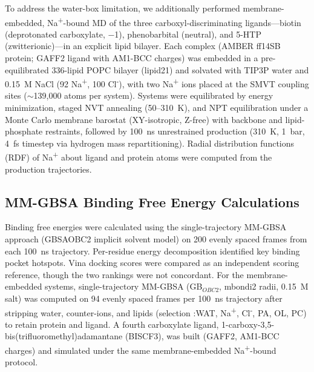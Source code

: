 \documentclass[pdflatex,sn-nature]{sn-jnl}
\begin{document}
To address the water-box limitation, we additionally performed membrane-embedded, Na\textsuperscript{+}-bound MD of the three carboxyl-discriminating ligands---biotin (deprotonated carboxylate, $-$1), phenobarbital (neutral), and 5-HTP (zwitterionic)---in an explicit lipid bilayer. Each complex (AMBER ff14SB protein; GAFF2 ligand with AM1-BCC charges) was embedded in a pre-equilibrated 336-lipid POPC bilayer (lipid21) and solvated with TIP3P water and 0.15~M NaCl (92 Na\textsuperscript{+}, 100 Cl\textsuperscript{-}), with two Na\textsuperscript{+} ions placed at the SMVT coupling sites ($\sim$139,000 atoms per system). Systems were equilibrated by energy minimization, staged NVT annealing (50--310~K), and NPT equilibration under a Monte Carlo membrane barostat (XY-isotropic, Z-free) with backbone and lipid-phosphate restraints, followed by 100~ns unrestrained production (310~K, 1~bar, 4~fs timestep via hydrogen mass repartitioning). Radial distribution functions (RDF) of Na\textsuperscript{+} about ligand and protein atoms were computed from the production trajectories.

\subsection*{MM-GBSA Binding Free Energy Calculations}

Binding free energies were calculated using the single-trajectory MM-GBSA approach (GBSAOBC2 implicit solvent model) on 200 evenly spaced frames from each 100~ns trajectory. Per-residue energy decomposition identified key binding pocket hotspots. Vina docking scores were compared as an independent scoring reference, though the two rankings were not concordant. For the membrane-embedded systems, single-trajectory MM-GBSA (GB$_{OBC2}$, mbondi2 radii, 0.15~M salt) was computed on 94 evenly spaced frames per 100~ns trajectory after stripping water, counter-ions, and lipids (selection :WAT, Na\textsuperscript{+}, Cl\textsuperscript{-}, PA, OL, PC) to retain protein and ligand. A fourth carboxylate ligand, 1-carboxy-3,5-bis(trifluoromethyl)adamantane (BISCF3), was built (GAFF2, AM1-BCC charges) and simulated under the same membrane-embedded Na\textsuperscript{+}-bound protocol.
\end{document}
